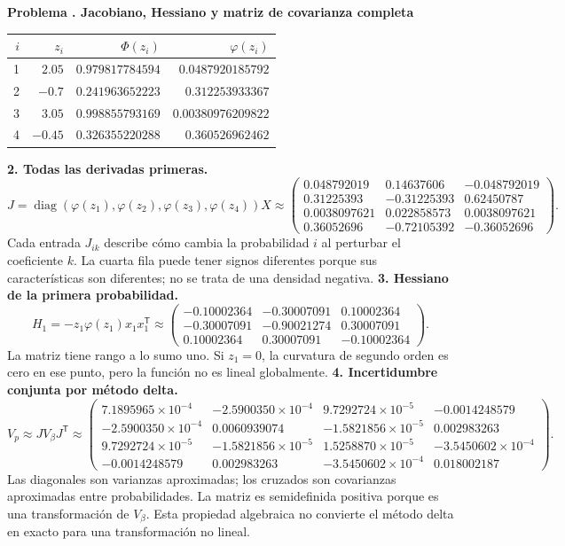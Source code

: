 \documentclass[11pt,a4paper]{article}
\newcommand{\T}{^{\mathsf T}}
\DeclareMathOperator{\diag}{diag}
\theoremstyle{definition}
\newcounter{problema}
\newenvironment{resuelto}[1]{\refstepcounter{problema}\par\medskip\Needspace{6\baselineskip}\textbf{Problema \theproblema. #1}\par}{\par\medskip}
\begin{document}
\begin{resuelto}{Jacobiano, Hessiano y matriz de covarianza completa}
\begin{center}\small\begin{tabular}{rrrr}
\toprule
$i$&$z_i$&$\Phi(z_i)$&$\varphi(z_i)$\\
\midrule
1&$2.05$&$0.979817784594$&$0.0487920185792$\\
2&$-0.7$&$0.241963652223$&$0.312253933367$\\
3&$3.05$&$0.998855793169$&$0.00380976209822$\\
4&$-0.45$&$0.326355220288$&$0.360526962462$\\
\bottomrule\end{tabular}\end{center}
\textbf{2. Todas las derivadas primeras.}
\[
J=\diag(\varphi(z_1),\varphi(z_2),\varphi(z_3),\varphi(z_4))X\approx\begin{pmatrix}0.048792019&0.14637606&-0.048792019\\0.31225393&-0.31225393&0.62450787\\0.0038097621&0.022858573&0.0038097621\\0.36052696&-0.72105392&-0.36052696\end{pmatrix}.
\]
Cada entrada $J_{ik}$ describe cómo cambia la probabilidad $i$ al perturbar el coeficiente $k$. La cuarta fila puede tener signos diferentes porque sus características son diferentes; no se trata de una densidad negativa.
\textbf{3. Hessiano de la primera probabilidad.}
\[
H_1=-z_1\varphi(z_1)x_1x_1\T\approx\begin{pmatrix}-0.10002364&-0.30007091&0.10002364\\-0.30007091&-0.90021274&0.30007091\\0.10002364&0.30007091&-0.10002364\end{pmatrix}.
\]
La matriz tiene rango a lo sumo uno. Si $z_1=0$, la curvatura de segundo orden es cero en ese punto, pero la función no es lineal globalmente.
\textbf{4. Incertidumbre conjunta por método delta.}
\[
V_p\approx JV_\beta J\T\approx\begin{pmatrix}7.1895965\times10^{-4}&-2.5900350\times10^{-4}&9.7292724\times10^{-5}&-0.0014248579\\-2.5900350\times10^{-4}&0.0060939074&-1.5821856\times10^{-5}&0.002983263\\9.7292724\times10^{-5}&-1.5821856\times10^{-5}&1.5258870\times10^{-5}&-3.5450602\times10^{-4}\\-0.0014248579&0.002983263&-3.5450602\times10^{-4}&0.018002187\end{pmatrix}.
\]
Las diagonales son varianzas aproximadas; los cruzados son covarianzas aproximadas entre probabilidades. La matriz es semidefinida positiva porque es una transformación de $V_\beta$. Esta propiedad algebraica no convierte el método delta en exacto para una transformación no lineal.

\end{resuelto}
\end{document}

